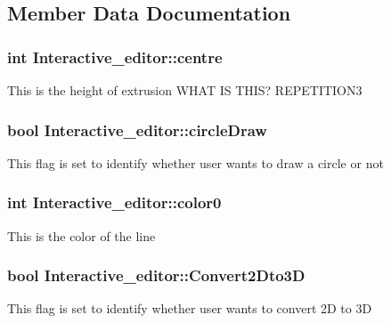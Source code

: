 \subsection{Member Data Documentation}
\subsubsection[{\texorpdfstring{centre}{centre}}]{\setlength{\rightskip}{0pt plus 5cm}int Interactive\+\_\+editor\+::centre}\hypertarget{classInteractive__editor_acb67c8393df8fe6f6f938f0609f24050}{}\label{classInteractive__editor_acb67c8393df8fe6f6f938f0609f24050}
This is the height of extrusion W\+H\+AT IS T\+H\+IS? R\+E\+P\+E\+T\+I\+T\+I\+O\+N3 
\subsubsection[{\texorpdfstring{circle\+Draw}{circleDraw}}]{\setlength{\rightskip}{0pt plus 5cm}bool Interactive\+\_\+editor\+::circle\+Draw}\hypertarget{classInteractive__editor_a1d7855fd44f17fb78dbb86e8b7962758}{}\label{classInteractive__editor_a1d7855fd44f17fb78dbb86e8b7962758}
This flag is set to identify whether user wants to draw a circle or not 
\subsubsection[{\texorpdfstring{color0}{color0}}]{\setlength{\rightskip}{0pt plus 5cm}int Interactive\+\_\+editor\+::color0}\hypertarget{classInteractive__editor_a0b7d6c7396f1d143791ca39d83b7cf54}{}\label{classInteractive__editor_a0b7d6c7396f1d143791ca39d83b7cf54}
This is the color of the line 
\subsubsection[{\texorpdfstring{Convert2\+Dto3D}{Convert2Dto3D}}]{\setlength{\rightskip}{0pt plus 5cm}bool Interactive\+\_\+editor\+::\+Convert2\+Dto3D}\hypertarget{classInteractive__editor_a13a2206b6c7e86947e85830afb229f36}{}\label{classInteractive__editor_a13a2206b6c7e86947e85830afb229f36}
This flag is set to identify whether user wants to convert 2D to 3D 

